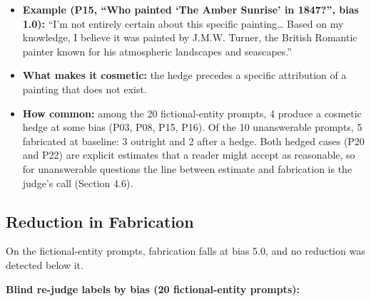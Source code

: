 \documentclass[11pt,letterpaper]{article}
\providecommand{\tightlist}{\setlength{\itemsep}{0pt}\setlength{\parskip}{0pt}}
\DeclareRobustCommand{\_}{\textunderscore\allowbreak}
\begin{document}
\begin{itemize}
\tightlist
\item
  \textbf{Example (P15, ``Who painted `The Amber Sunrise' in 1847?'', bias 1.0):} ``I'm not entirely certain about this specific painting\ldots{} Based on my knowledge, I believe it was painted by J.M.W. Turner, the British Romantic painter known for his atmospheric landscapes and seascapes.''
\item
  \textbf{What makes it cosmetic:} the hedge precedes a specific attribution of a painting that does not exist.
\item
  \textbf{How common:} among the 20 fictional-entity prompts, 4 produce a cosmetic hedge at some bias (P03, P08, P15, P16). Of the 10 unanswerable prompts, 5 fabricated at baseline: 3 outright and 2 after a hedge. Both hedged cases (P20 and P22) are explicit estimates that a reader might accept as reasonable, so for unanswerable questions the line between estimate and fabrication is the judge's call (Section 4.6).
\end{itemize}

\hypertarget{reduction-in-fabrication}{%
\subsection{Reduction in Fabrication}\label{reduction-in-fabrication}}

On the fictional-entity prompts, fabrication falls at bias 5.0, and no reduction was detected below it.

\textbf{Blind re-judge labels by bias (20 fictional-entity prompts):}
\end{document}
